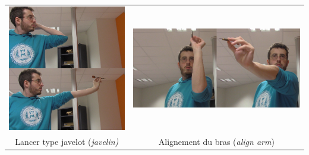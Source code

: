 \documentclass[svgnames]{beamer}
\begin{document}
\begin{frame}{\subsubsecname}
\begin{table}
{\begin{tabular}{cc}
				\\
				\includegraphics[scale=0.25]{img/darts_javelin_final.png} &\includegraphics[scale=0.25]{img/darts_align_arm_final.png}\\
				Lancer type javelot (\textit{javelin)} & Alignement du bras (\textit{align arm})\\
			\end{tabular}}
		\end{table}
		
		

	\end{frame}
	
\end{document}
